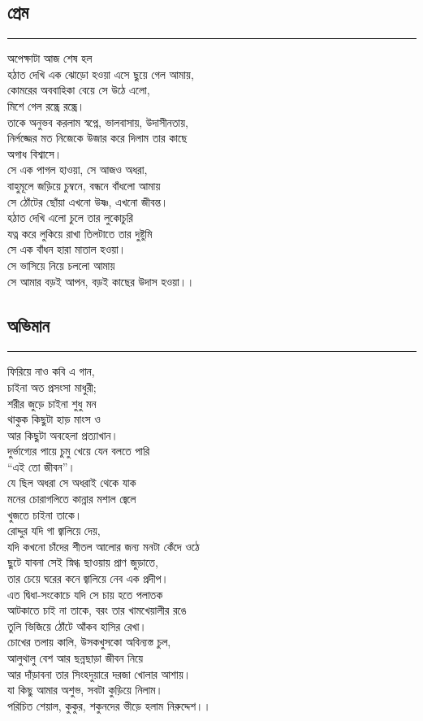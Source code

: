 \documentclass[12pt]{article}
\begin{document}
\subsection*{প্রেম }
\hrule
\vspace{1in}
অপেক্ষাটা আজ শেষ হল\\
হঠাত দেখি এক ঝোড়ো হওয়া এসে ছুয়ে গেল আমায়,\\
কোমরের অববাহিকা বেয়ে সে উঠে এলো,\\
মিশে গেল রন্ধ্রে রন্ধ্রে।\\
তাকে অনুভব করলাম স্বপ্নে, ভালবাসায়, উদাসীনতায়,\\
নির্লজ্জের মত নিজেকে উজার করে দিলাম তার কাছে\\
অগাধ বিশ্বাসে।\\
সে এক পাগল হাওয়া, সে আজও অধরা,\\
বাহুমূলে জড়িয়ে চুম্বনে, বন্ধনে বাঁধলো আমায়\\
সে ঠোঁটের ছোঁয়া এখনো উষ্ণ, এখনো জীবন্ত।\\
হঠাত দেখি এলো চুলে তার লুকোচুরি\\
যত্ন করে লুকিয়ে রাখা তিলটাতে তার দুষ্টুমি\\
সে এক বাঁধন হারা মাতাল হওয়া।\\
সে ভাসিয়ে নিয়ে চললো আমায়\\
সে আমার বড়ই আপন, বড়ই কাছের উদাস হওয়া।।\\
\newpage

\subsection*{অভিমান }
\hrule
\vspace{1in}
ফিরিয়ে নাও কবি এ গান,\\
চাইনা অত প্রসংসা মাধুরী;\\
শরীর জুড়ে চাইনা শুধু মন\\
থাকুক কিছুটা হাড় মাংস ও\\
আর কিছুটা অবহেলা প্রত্যাখান।\\
দুর্ভাগ্যের পায়ে চুমু খেয়ে যেন বলতে পারি\\
``এই তো জীবন''।\\
যে ছিল অধরা সে অধরাই থেকে যাক\\
মনের চোরাগলিতে কান্নার মশাল জ্বেলে\\
খুজতে চাইনা তাকে।\\
রোদ্দুর যদি গা জ্বালিয়ে দেয়,\\
যদি কখনো চাঁদের শীতল আলোর জন্য মনটা কেঁদে ওঠে\\
ছুটে যাবনা সেই স্নিগ্ধ ছাওয়ায় প্রাণ জুড়াতে,\\
তার চেয়ে ঘরের কনে জ্বালিয়ে নেব এক প্রদীপ।\\
এত দ্বিধা-সংকোচে  যদি সে চায় হতে পলাতক\\
আটকাতে চাই না তাকে, বরং তার খামখেয়ালীর রঙে\\
তুলি ভিজিয়ে ঠোঁটে আঁকব হাসির রেখা।\\
চোখের তলায় কালি, উসকখুসকো অবিন্যস্ত চুল,\\
আলুথালু বেশ আর ছন্নছাড়া জীবন নিয়ে\\
আর দাঁড়াবনা তার সিংহদুয়ারে দরজা খোলার আশায়।\\
যা কিছু আমার অশুভ, সবটা কুড়িয়ে নিলাম।\\
পরিচিত শেয়াল, কুকুর, শকুনদের ভীড়ে হলাম নিরুদ্দেশ।।\\
\newpage
\end{document}
